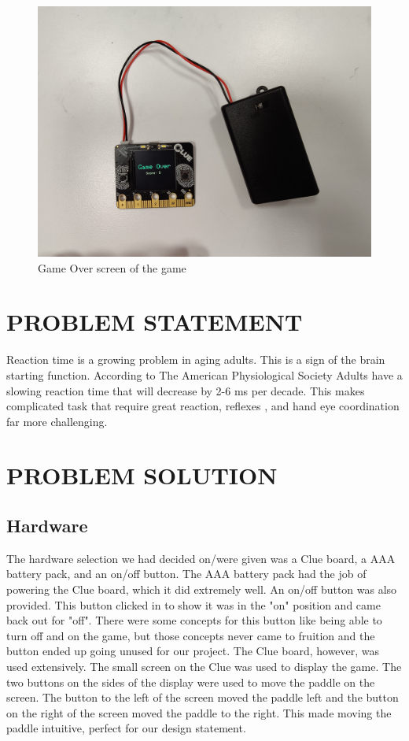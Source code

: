 \documentclass[12pt]{article}
\begin{document}
\begin{figure}[!t]
\centering
\includegraphics[width=4.5in]{images/Gameover_Screen.jpg}
\caption{Game Over screen of the game}
\label{fig:gameover}
\end{figure}


\section{PROBLEM STATEMENT}
Reaction time is a growing problem in aging adults. This is a sign of the brain starting function. According to  The American Physiological Society \cite{sbc} Adults have a slowing reaction time that will decrease by 2-6 ms per decade. This makes complicated task that require great reaction, reflexes , and hand eye coordination far more challenging.

\section{PROBLEM SOLUTION}
\subsection{Hardware}
The hardware selection we had decided on/were given was a Clue board, a AAA battery pack, and an on/off button. The AAA battery pack had the job of powering the Clue board, which it did extremely well. An on/off button was also provided. This button clicked in to show it was in the "on" position and came back out for "off". There were some concepts for this button like being able to turn off and on the game, but those concepts never came to fruition and the button ended up going unused for our project. The Clue board, however, was used extensively. The small screen on the Clue was used to display the game. The two buttons on the sides of the display were used to move the paddle on the screen. The button to the left of the screen moved the paddle left and the button on the right of the screen moved the paddle to the right. This made moving the paddle intuitive, perfect for our design statement.
\end{document}
